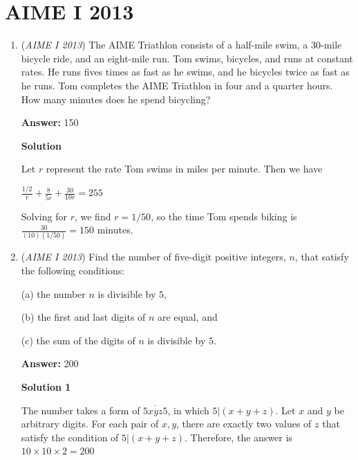 \section{AIME I 2013}
        \begin{enumerate}
        	\item (\textit{AIME I 2013}) The AIME Triathlon consists of a half-mile swim, a 30-mile bicycle ride, and an eight-mile run. Tom swims, bicycles, and runs at constant rates. He runs fives times as fast as he swims, and he bicycles twice as fast as he runs. Tom completes the AIME Triathlon in four and a quarter hours. How many minutes does he spend bicycling?


 
 \textbf{Answer: }150



\textbf{Solution}

Let $r$ represent the rate Tom swims in miles per minute. Then we have

 $\frac{1/2}{r} + \frac{8}{5r} + \frac{30}{10r} = 255$

 Solving for $r$, we find $r = 1/50$, so the time Tom spends biking is $\frac{30}{(10)(1/50)} = \boxed{150}$ minutes.

 


	\item (\textit{AIME I 2013}) Find the number of five-digit positive integers, $n$, that satisfy the following conditions:


 
            \begin{itemize}
(a) the number $n$ is divisible by $5,$

            \end{itemize}
            
            \begin{itemize}
(b) the first and last digits of $n$ are equal, and

            \end{itemize}
            
            \begin{itemize}
(c) the sum of the digits of $n$ is divisible by $5.$

            \end{itemize}
            
 \textbf{Answer: }200



\textbf{Solution 1}

The number takes a form of $\overline{5xyz5}$, in which $5|(x+y+z)$. Let $x$ and $y$ be arbitrary digits. For each pair of $x,y$, there are exactly two values of $z$ that satisfy the condition of $5|(x+y+z)$. Therefore, the answer is $10\times10\times2=\boxed{200}$





\end{enumerate}
